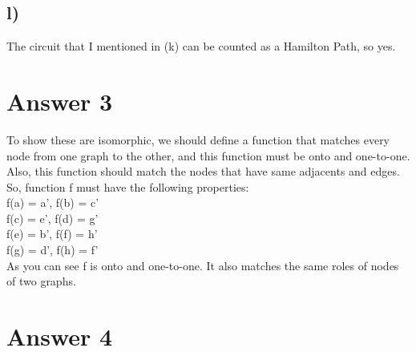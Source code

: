 \documentclass[12pt]{article}
\begin{document}
\subsection*{l)}
The circuit that I mentioned in (k) can be counted as a Hamilton Path, so yes.

\section*{Answer 3}
To show these are isomorphic, we should define a function that matches every node from one graph to the other, and this function must be onto and one-to-one. Also, this function should match the nodes that have same adjacents and edges. So, function f must have the following properties: \\
f(a) = a', f(b) = c'\\
f(c) = e', f(d) = g'\\
f(e) = b', f(f) = h'\\
f(g) = d', f(h) = f'\\
As you can see f is onto and one-to-one. It also matches the same roles of nodes of two graphs.

\section*{Answer 4}
    
\end{document}

